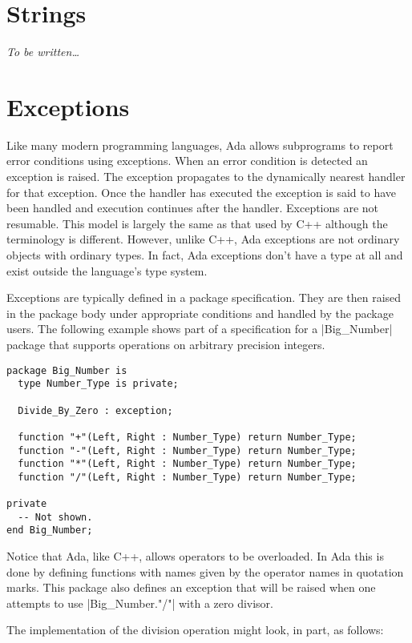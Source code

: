 \section{Strings}

\emph{To be written\ldots}

\section{Exceptions}

Like many modern programming languages, Ada allows subprograms to report error conditions using
exceptions. When an error condition is detected an exception is raised. The exception propagates
to the dynamically nearest handler for that exception. Once the handler has executed the
exception is said to have been handled and execution continues after the handler. Exceptions are
not resumable. This model is largely the same as that used by C++ although the terminology is
different. However, unlike C++, Ada exceptions are not ordinary objects with ordinary types. In
fact, Ada exceptions don't have a type at all and exist outside the language's type system.

Exceptions are typically defined in a package specification. They are then raised in the package
body under appropriate conditions and handled by the package users. The following example shows
part of a specification for a |Big_Number| package that supports operations on arbitrary
precision integers.

\begin{lstlisting}
package Big_Number is
  type Number_Type is private;

  Divide_By_Zero : exception;

  function "+"(Left, Right : Number_Type) return Number_Type;
  function "-"(Left, Right : Number_Type) return Number_Type;
  function "*"(Left, Right : Number_Type) return Number_Type;
  function "/"(Left, Right : Number_Type) return Number_Type;

private
  -- Not shown.
end Big_Number;
\end{lstlisting}

Notice that Ada, like C++, allows operators to be overloaded. In Ada this is done by defining
functions with names given by the operator names in quotation marks. This package also defines
an exception that will be raised when one attempts to use |Big_Number."/"| with a zero divisor.

The implementation of the division operation might look, in part, as follows:

